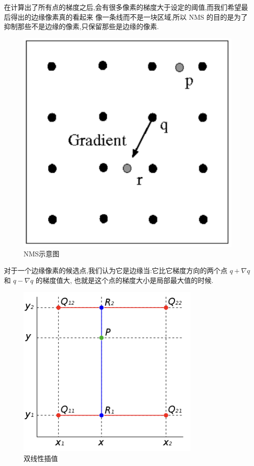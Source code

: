 在计算出了所有点的梯度之后,会有很多像素的梯度大于设定的阈值,而我们希望最后得出的边缘像素真的看起来
像一条线而不是一块区域,所以 NMS 的目的是为了抑制那些不是边缘的像素,只保留那些是边缘的像素.

\begin{figure}[htbp]
    \centering
	\includegraphics[scale=0.2]{figures/NMS.png}
	\caption{NMS示意图}
\end{figure}

对于一个边缘像素的候选点,我们认为它是边缘当:它比它梯度方向的两个点 $q+\nabla q$ 和 $q-\nabla q$ 的梯度值大,
也就是这个点的梯度大小是局部最大值的时候.

\begin{figure}[htbp]
    \centering
	\includegraphics[scale=0.4]{figures/bilinear.png}
	\caption{双线性插值}
\end{figure}

